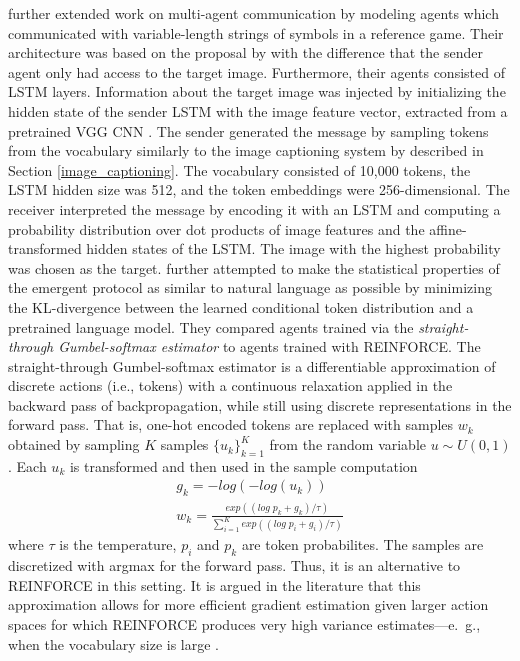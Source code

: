 \cite{havrylov2017emergence} further extended work on multi-agent communication by modeling agents which communicated with variable-length strings of symbols in a reference game. 
Their architecture was based on the proposal by \cite{lazaridou2016multi} with the difference that the sender agent only had access to the target image. Furthermore, their agents consisted of LSTM layers. Information about the target image was injected by initializing the hidden state of the sender LSTM with the image feature vector, extracted from a pretrained VGG CNN \parencite{simonyan2014very}. The sender generated the message by sampling tokens from the vocabulary similarly to the image captioning system by \cite{vinyals2015show} described in Section \ref{image_captioning}. The vocabulary consisted of 10,000 tokens, the LSTM hidden size was 512, and the token embeddings were 256-dimensional. 
The receiver interpreted the message by encoding it with an LSTM and computing a probability distribution over dot products of image features and the affine-transformed hidden states of the LSTM. The image with the highest probability was chosen as the target. \cite{havrylov2017emergence} further attempted to make the statistical properties of the emergent protocol as similar to natural language as possible by minimizing the KL-divergence between the learned conditional token distribution and a pretrained language model.
They compared agents trained via the \textit{straight-through Gumbel-softmax estimator} to agents trained with REINFORCE. The straight-through Gumbel-softmax estimator is a differentiable approximation of discrete actions (i.e., tokens) with a continuous relaxation applied in the backward pass of backpropagation, while still using discrete representations in the forward pass. 
That is, one-hot encoded tokens are replaced with samples $w_k$ obtained by sampling $K$ samples  $\{u_k\}_{k=1}^K$ from the random variable $u \sim U(0,1)$. Each $u_k$ is transformed and then used in the sample computation
\begin{equation}
\begin{aligned}
g_k = -log(-log(u_k)) \\
w_k = \frac{exp((log \; p_k + g_k) / \tau)}{\sum_{i=1}^{K} exp((log \; p_i + g_i) / \tau)}
\end{aligned}
\end{equation}
where $\tau$ is the temperature, $p_i$ and $p_k$ are token probabilites. The samples are discretized with argmax for the forward pass. Thus, it is an alternative to REINFORCE in this setting.
It is argued in the literature that this approximation allows for more efficient gradient estimation given larger action spaces for which REINFORCE produces very high variance estimates---e.~g., when the vocabulary size is large \parencite{havrylov2017emergence}.
